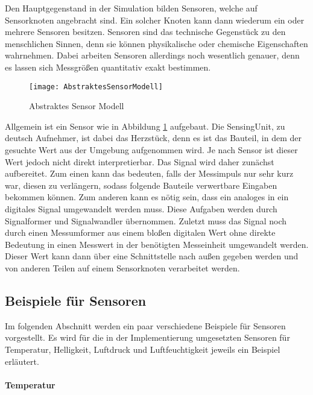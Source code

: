 Den Hauptgegenstand in der Simulation bilden Sensoren, welche auf Sensorknoten angebracht sind. Ein solcher Knoten kann dann wiederum ein oder mehrere Sensoren besitzen.\newline
Sensoren sind das technische Gegenstück zu den menschlichen Sinnen, denn sie können physikalische oder chemische Eigenschaften wahrnehmen. Dabei arbeiten Sensoren allerdings noch wesentlich genauer, denn es lassen sich Messgrößen quantitativ exakt bestimmen.\newline

\begin{figure}[htbp]
\centering
\caption{Abstraktes Sensor Modell}
\label{fig:AbstraktesSensorModell}
\texttt{[image: AbstraktesSensorModell]}
\end{figure}

Allgemein ist ein Sensor wie in Abbildung \ref{fig:AbstraktesSensorModell} aufgebaut. Die SensingUnit, zu deutsch Aufnehmer, ist dabei das Herzstück, denn es ist das Bauteil, in dem der gesuchte Wert aus der Umgebung aufgenommen wird. Je nach Sensor ist dieser Wert jedoch nicht direkt interpretierbar. Das Signal wird daher zunächst aufbereitet. Zum einen kann das bedeuten, falls der Messimpuls nur sehr kurz war, diesen zu verlängern, sodass folgende Bauteile verwertbare Eingaben bekommen können. Zum anderen kann es nötig sein, dass ein analoges in ein digitales Signal umgewandelt werden muss. Diese Aufgaben werden durch Signalformer und Signalwandler übernommen.\newline
Zuletzt muss das Signal noch durch einen Messumformer aus einem bloßen digitalen Wert ohne direkte Bedeutung in einen Messwert in der benötigten Messeinheit umgewandelt werden. Dieser Wert kann dann über eine Schnittstelle nach außen gegeben werden und von anderen Teilen auf einem Sensorknoten verarbeitet werden.

\subsection*{Beispiele für Sensoren}

Im folgenden Abschnitt werden ein paar verschiedene Beispiele für Sensoren vorgestellt. Es wird für die in der Implementierung umgesetzten Sensoren für Temperatur, Helligkeit, Luftdruck und Luftfeuchtigkeit jeweils ein Beispiel erläutert.

\paragraph{Temperatur}

